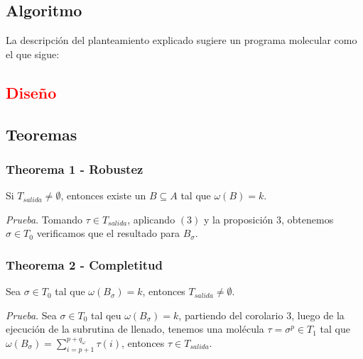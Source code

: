 \documentclass[12pt, letterpaper, twoside]{article}
\begin{document}
    \subsection{Algoritmo}
    La descripción del planteamiento explicado sugiere un programa molecular como el que sigue:
    \begin{algorithm}
        \begin{algorithmic}[1]
            \EndProcedure
        \end{algorithmic}
    \end{algorithm}

    \newpage
    \subsection{\textcolor{red}{Diseño}}

    \subsection{Teoremas}
    \subsubsection{Theorema 1 - Robustez}
    Si $T_{salida}\neq\emptyset$, entonces existe un $B\subseteq{A}$ tal que $\omega(B)=k$.

    \emph{Prueba}. Tomando $\tau\in{T_{salida}}$, aplicando $(3)$ y la proposición 3, obtenemos $\sigma\in{T_0}$ verificamos que el resultado para $B_\sigma$.

    \subsubsection{Theorema 2 - Completitud}
    Sea $\sigma\in{T_0}$ tal que $\omega(B_\sigma)=k$, entonces $T_{salida}\neq\emptyset$.

    \emph{Prueba}. Sea $\sigma\in{T_0}$ tal qeu $\omega(B_\sigma)=k$, partiendo del corolario 3, luego de la ejecución de la subrutina de llenado, tenemos una molécula $\tau=\sigma^{p}\in{T_1}$ tal que $\omega(B_\sigma)=\sum^{p+q_\omega}_{i=p+1}\tau(i)$, entonces $\tau\in{T_{salida}}$.

    \newpage
\end{document}
